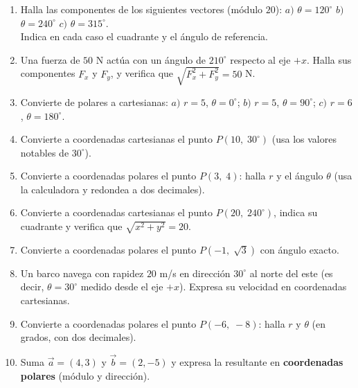 \documentclass[12pt, letterpaper]{article}
\begin{document}
\begin{enumerate}[leftmargin=*, resume]
  \item \medio{} Halla las componentes de los siguientes vectores (módulo $20$):
        $a)$ $\theta = 120^{\circ}$ \quad $b)$ $\theta = 240^{\circ}$ \quad $c)$ $\theta = 315^{\circ}$.\\
        Indica en cada caso el cuadrante y el ángulo de referencia.

  \item \dificil{} Una fuerza de $50$ N actúa con un ángulo de $210^{\circ}$ respecto al eje $+x$. Halla sus componentes $F_x$ y $F_y$, y verifica que $\sqrt{F_x^2 + F_y^2} = 50$ N.

  \item \facil{} Convierte de polares a cartesianas: $a)$ $r = 5$, $\theta = 0^{\circ}$; \quad $b)$ $r = 5$, $\theta = 90^{\circ}$; \quad $c)$ $r = 6$, $\theta = 180^{\circ}$.

  \item \facil{} Convierte a coordenadas cartesianas el punto $P(10,\; 30^{\circ})$ (usa los valores notables de $30^{\circ}$).

  \item \facil{} Convierte a coordenadas polares el punto $P(3,\; 4)$: halla $r$ y el ángulo $\theta$ (usa la calculadora y redondea a dos decimales).

  \item \medio{} Convierte a coordenadas cartesianas el punto $P(20,\; 240^{\circ})$, indica su cuadrante y verifica que $\sqrt{x^2 + y^2} = 20$.

  \item \medio{} Convierte a coordenadas polares el punto $P(-1,\; \sqrt{3})$ con ángulo exacto.

  \item \medio{} Un barco navega con rapidez $20$ m/s en dirección $30^{\circ}$ al norte del este (es decir, $\theta = 30^{\circ}$ medido desde el eje $+x$). Expresa su velocidad en coordenadas cartesianas.

  \item \dificil{} Convierte a coordenadas polares el punto $P(-6,\; -8)$: halla $r$ y $\theta$ (en grados, con dos decimales).

  \item \dificil{} Suma $\vec{a} = (4, 3)$ y $\vec{b} = (2, -5)$ y expresa la resultante en \textbf{coordenadas polares} (módulo y dirección).
\end{enumerate}
\end{document}
